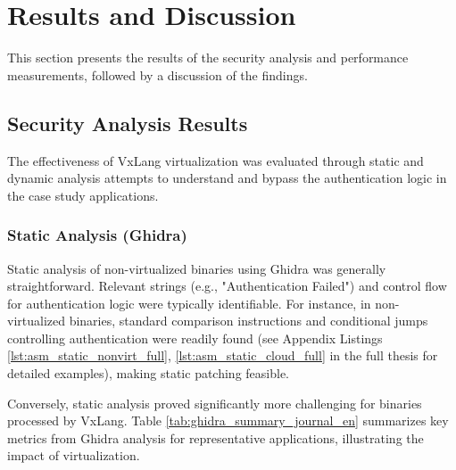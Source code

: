\section{Results and Discussion} \label{sec:results_discussion}
This section presents the results of the security analysis and performance measurements, followed by a discussion of the findings.

\subsection{Security Analysis Results}
The effectiveness of VxLang virtualization was evaluated through static and dynamic analysis attempts to understand and bypass the authentication logic in the case study applications.

\subsubsection{Static Analysis (Ghidra)}
Static analysis of non-virtualized binaries using Ghidra was generally straightforward. Relevant strings (e.g., "Authentication Failed") and control flow for authentication logic were typically identifiable. For instance, in non-virtualized binaries, standard comparison instructions and conditional jumps controlling authentication were readily found (see Appendix Listings \ref{lst:asm_static_nonvirt_full}, \ref{lst:asm_static_cloud_full} in the full thesis for detailed examples), making static patching feasible.

Conversely, static analysis proved significantly more challenging for binaries processed by VxLang. Table \ref{tab:ghidra_summary_journal_en} summarizes key metrics from Ghidra analysis for representative applications, illustrating the impact of virtualization.

